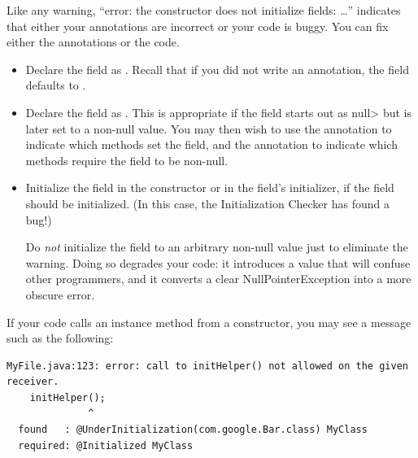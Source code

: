 


Like any warning, ``error:  the constructor does not initialize fields:
\ldots'' indicates that either your annotations are incorrect or your code
is buggy.  You can fix either the annotations or the code.

\begin{itemize}
\item
  Declare the field as .  Recall
  that if you did not write an annotation, the field defaults to
  .
\item
  Declare the field as .
  This is appropriate if the field starts out as \<null> but is later set
  to a non-null value.  You may then wish to use the
   annotation to indicate
  which methods set the field, and the
   annotation to indicate
  which methods require the field to be non-null.
\item
  Initialize the field in the constructor or in the field's initializer, if
  the field should be initialized.  (In this case, the Initialization
  Checker has found a bug!)

  Do \emph{not} initialize the field to an arbitrary non-null value just to
  eliminate the warning.  Doing so degrades your code:  it introduces a
  value that will confuse other programmers, and it converts a clear
  NullPointerException into a more obscure error.
\end{itemize}


If your code calls an instance method from a constructor, you may see a
message such as the following:

\begin{Verbatim}
MyFile.java:123: error: call to initHelper() not allowed on the given receiver.
    initHelper();
              ^
  found   : @UnderInitialization(com.google.Bar.class) MyClass
  required: @Initialized MyClass
\end{Verbatim}

